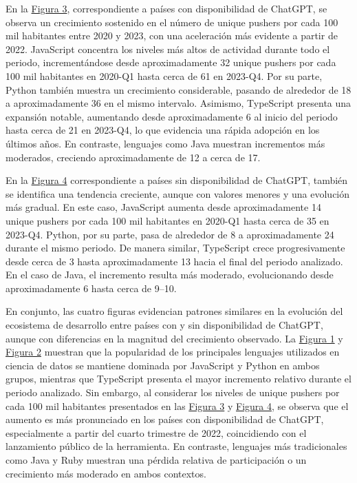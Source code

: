 \documentclass[12pt,a4paper]{article}
\begin{document}
En la \hyperref[fig:figura3]{Figura 3}, correspondiente a países con disponibilidad de ChatGPT, se observa un crecimiento sostenido en el número de unique pushers por cada 100 mil habitantes entre 2020 y 2023, con una aceleración más evidente a partir de 2022. JavaScript concentra los niveles más altos de actividad durante todo el periodo, incrementándose desde aproximadamente 32 unique pushers por cada 100 mil habitantes en 2020-Q1 hasta cerca de 61 en 2023-Q4. Por su parte, Python también muestra un crecimiento considerable, pasando de alrededor de 18 a aproximadamente 36 en el mismo intervalo. Asimismo, TypeScript presenta una expansión notable, aumentando desde aproximadamente 6 al inicio del periodo hasta cerca de 21 en 2023-Q4, lo que evidencia una rápida adopción en los últimos años. En contraste, lenguajes como Java muestran incrementos más moderados, creciendo aproximadamente de 12 a cerca de 17.

En la \hyperref[fig:figura4]{Figura 4} correspondiente a países sin disponibilidad de ChatGPT, también se identifica una tendencia creciente, aunque con valores menores y una evolución más gradual. En este caso, JavaScript aumenta desde aproximadamente 14 unique pushers por cada 100 mil habitantes en 2020-Q1 hasta cerca de 35 en 2023-Q4. Python, por su parte, pasa de alrededor de 8 a aproximadamente 24 durante el mismo periodo. De manera similar, TypeScript crece progresivamente desde cerca de 3 hasta aproximadamente 13 hacia el final del periodo analizado. En el caso de Java, el incremento resulta más moderado, evolucionando desde aproximadamente 6 hasta cerca de 9–10.

En conjunto, las cuatro figuras evidencian patrones similares en la evolución del ecosistema de desarrollo entre países con y sin disponibilidad de ChatGPT, aunque con diferencias en la magnitud del crecimiento observado. La \hyperref[fig:figura1]{Figura 1} y \hyperref[fig:figura2]{Figura 2} muestran que la popularidad de los principales lenguajes utilizados en ciencia de datos se mantiene dominada por JavaScript y Python en ambos grupos, mientras que TypeScript presenta el mayor incremento relativo durante el periodo analizado. Sin embargo, al considerar los niveles de unique pushers por cada 100 mil habitantes presentados en las \hyperref[fig:figura3]{Figura 3} y \hyperref[fig:figura4]{Figura 4}, se observa que el aumento es más pronunciado en los países con disponibilidad de ChatGPT, especialmente a partir del cuarto trimestre de 2022, coincidiendo con el lanzamiento público de la herramienta. En contraste, lenguajes más tradicionales como Java y Ruby muestran una pérdida relativa de participación o un crecimiento más moderado en ambos contextos.
\end{document}
